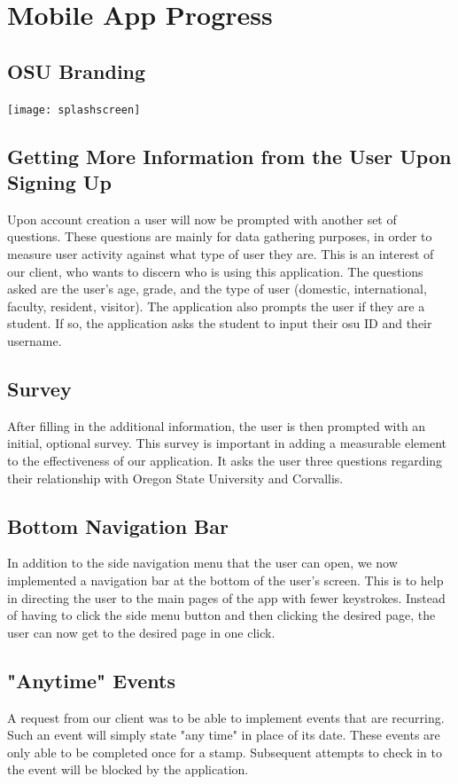 \documentclass[onecolumn, draftclsnofoot,10pt, compsoc]{IEEEtran}
\begin{document}
\section{Mobile App Progress}
  \subsection{OSU Branding}
    \texttt{[image: splashscreen]}

  \subsection{Getting More Information from the User Upon Signing Up}
  Upon account creation a user will now be prompted with another set of questions. These questions are mainly for data gathering purposes,
  in order to measure user activity against what type of user they are. This is an interest of our client, who wants to discern who is using this application.
  The questions asked are the user's age, grade, and the type of user (domestic, international, faculty, resident, visitor). The application also prompts
  the user if they are a student. If so, the application asks the student to input their osu ID and their username.

  \subsection{Survey}
  After filling in the additional information, the user is then prompted with an initial, optional survey. This survey is important in adding a measurable element
  to the effectiveness of our application. It asks the user three questions regarding their relationship with Oregon State University and Corvallis.

  \subsection{Bottom Navigation Bar}
  In addition to the side navigation menu that the user can open, we now implemented a navigation bar at the bottom of the user's screen. This is to help in directing
  the user to the main pages of the app with fewer keystrokes. Instead of having to click the side menu button and then clicking the desired page, the user can now
  get to the desired page in one click.

  \subsection{"Anytime" Events}
  A request from our client was to be able to implement events that are recurring. Such an event will simply state "any time" in place of its date. These events are only
  able to be completed once for a stamp. Subsequent attempts to check in to the event will be blocked by the application.
\end{document}
